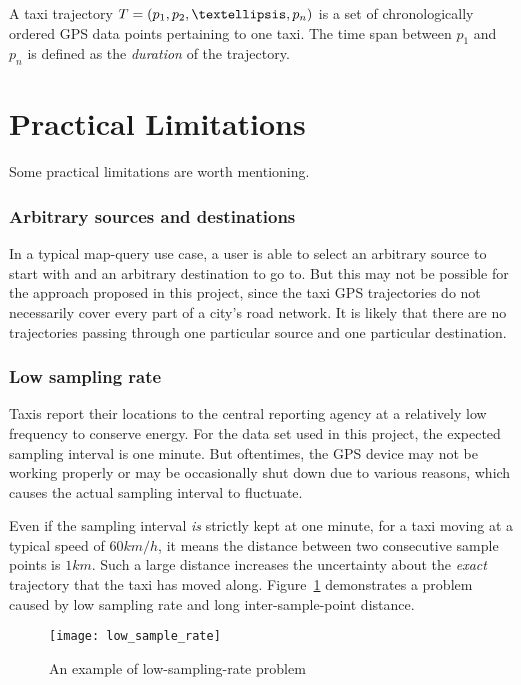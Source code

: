 \begin{defn}\label{Def: trajectory}
A taxi trajectory $T = (p_1,p_2,\textellipsis,p_n)$ is a set of chronologically ordered GPS data points pertaining to one taxi. The time span between $p_1$ and $p_n$ is defined as the \emph{duration} of the trajectory. 
\end{defn}

\section{Practical Limitations} \label{Sec:limitation}
Some practical limitations are worth mentioning. 
\subsubsection{Arbitrary sources and destinations}
In a typical map-query use case, a user is able to select an arbitrary source to start with and an arbitrary destination to go to. But this may not be possible for the approach proposed in this project, since the taxi GPS trajectories do not necessarily cover every part of a city's road network. It is likely that there are no trajectories passing through one particular source and one particular destination.

\subsubsection{Low sampling rate}
Taxis report their locations to the central reporting agency at a relatively low frequency to conserve energy. For the data set used in this project, the expected sampling interval is one minute. But oftentimes, the GPS device may not be working properly or may be occasionally shut down due to various reasons, which causes the actual sampling interval to fluctuate. 

Even if the sampling interval \emph{is} strictly kept at one minute, for a taxi moving at a typical speed of $60 km/h$, it means the distance between two consecutive sample points is $1 km$. Such a large distance increases the uncertainty about the \emph{exact} trajectory that the taxi has moved along. Figure~\ref{Fig:low_sampling_rate} \cite{TDR10} demonstrates a problem caused by low sampling rate and long inter-sample-point distance.
\begin{figure}[h!]
\texttt{[image: low\_sample\_rate]}
\centering
\caption{An example of low-sampling-rate problem}
\label{Fig:low_sampling_rate}
\end{figure}


